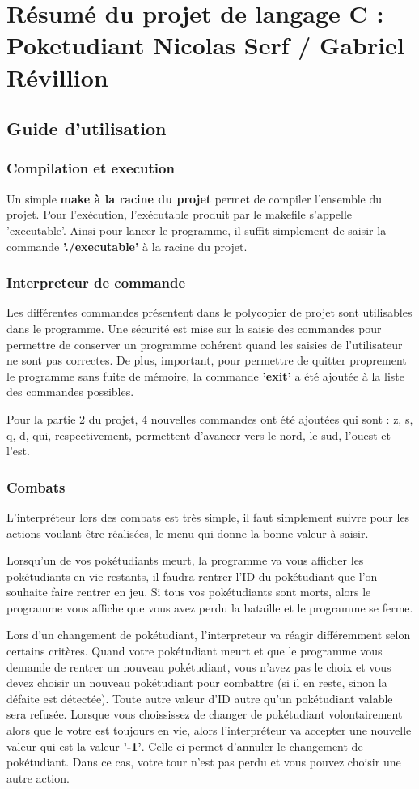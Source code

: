 \documentclass[10pt,a4paper,twocolumn]{report}
\begin{document}
\part{Résumé du projet de langage C : Poketudiant\newline
Nicolas Serf / Gabriel Révillion}

\chapter{Guide d'utilisation}
\section{Compilation et execution}
Un simple \textbf{make à la racine du projet} permet de compiler l'ensemble du projet.
Pour l'exécution, l'exécutable produit par le makefile s'appelle 'executable'.
Ainsi pour lancer le programme, il suffit simplement de saisir la commande \textbf{'./executable'} à la racine du projet.
\section{Interpreteur de commande}
Les différentes commandes présentent dans le polycopier de projet sont utilisables dans le programme.
Une sécurité est mise sur la saisie des commandes pour permettre de conserver un programme cohérent quand les saisies de l'utilisateur ne sont pas correctes.
De plus, important, pour permettre de quitter proprement le programme sans fuite de mémoire, la commande \textbf{'exit'} a été ajoutée à la liste des commandes possibles.

Pour la partie 2 du projet, 4 nouvelles commandes ont été ajoutées qui sont : z, s, q, d, qui, respectivement, permettent d'avancer vers le nord, le sud, l'ouest et l'est.
\section{Combats}
L'interpréteur lors des combats est très simple, il faut simplement suivre pour les actions voulant être réalisées, le menu qui donne la bonne valeur à saisir.

Lorsqu'un de vos pokétudiants meurt, la programme va vous afficher les pokétudiants en vie restants, il faudra rentrer l'ID du pokétudiant que l'on souhaite faire rentrer en jeu.
Si tous vos pokétudiants sont morts, alors le programme vous affiche que vous avez perdu la bataille et le programme se ferme.

Lors d'un changement de pokétudiant, l'interpreteur va réagir différemment selon certains critères.
Quand votre pokétudiant meurt et que le programme vous demande de rentrer un nouveau pokétudiant, vous n'avez pas le choix et vous devez choisir un nouveau pokétudiant pour combattre (si il en reste, sinon la défaite est détectée). Toute autre valeur d'ID autre qu'un pokétudiant valable sera refusée.
Lorsque vous choississez de changer de pokétudiant volontairement alors que le votre est toujours en vie, alors l'interpréteur va accepter une nouvelle valeur qui est la valeur \textbf{'-1'}. Celle-ci permet d'annuler le changement de pokétudiant. Dans ce cas, votre tour n'est pas perdu et vous pouvez choisir une autre action.
\end{document}
